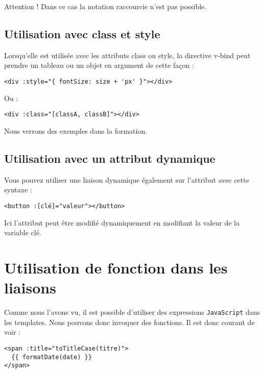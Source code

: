 Attention ! Dans ce cas la notation raccourcie n'est pas possible.
\subsection{Utilisation avec class et style}
Lorsqu'elle est utilisée avec les attributs class ou style, la directive v-bind peut prendre un tableau ou un objet en argument de cette façon :
\begin{verbatim}
<div :style="{ fontSize: size + 'px' }"></div>
\end{verbatim}
Ou :
\begin{verbatim}
<div :class="[classA, classB]"></div>
\end{verbatim}

Nous verrons des exemples dans la formation.

\subsection{Utilisation avec un attribut dynamique}
Vous pouvez utiliser une liaison dynamique également sur l'attribut avec cette syntaxe :
\begin{verbatim}
<button :[clé]="valeur"></button>
\end{verbatim}
Ici l'attribut peut être modifié dynamiquement en modifiant la valeur de la variable clé.


\section{Utilisation de fonction dans les liaisons}
Comme nous l'avons vu, il est possible d'utiliser des expressions {\tt JavaScript} dans les templates. Nous pouvons donc invoquer des fonctions. Il est donc courant de voir :
\begin{verbatim}
<span :title="toTitleCase(titre)">
  {{ formatDate(date) }}
</span>
\end{verbatim}

